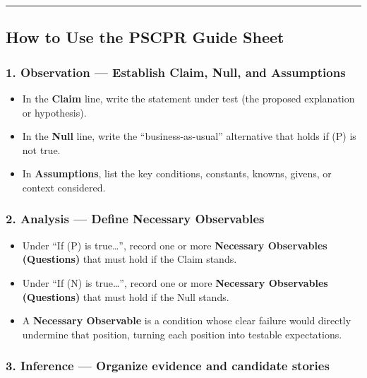 \documentclass[
  letterpaper,
  DIV=11,
  numbers=noendperiod]{scrartcl}
\providecommand{\tightlist}{%
  \setlength{\itemsep}{0pt}\setlength{\parskip}{0pt}}
\begin{document}
\begin{center}\rule{0.5\linewidth}{0.5pt}\end{center}

\subsection{How to Use the PSCPR Guide
Sheet}\label{how-to-use-the-pscpr-guide-sheet}

\subsubsection{1. Observation --- Establish Claim, Null, and
Assumptions}\label{observation-establish-claim-null-and-assumptions}

\begin{itemize}
\tightlist
\item
  In the \textbf{Claim} line, write the statement under test (the
  proposed explanation or hypothesis).
\item
  In the \textbf{Null} line, write the ``business-as-usual'' alternative
  that holds if (P) is not true.
\item
  In \textbf{Assumptions}, list the key conditions, constants, knowns,
  givens, or context considered.
\end{itemize}

\subsubsection{2. Analysis --- Define Necessary
Observables}\label{analysis-define-necessary-observables}

\begin{itemize}
\tightlist
\item
  Under ``If (P) is true\ldots{}'', record one or more \textbf{Necessary
  Observables (Questions)} that must hold if the Claim stands.
\item
  Under ``If (N) is true\ldots{}'', record one or more \textbf{Necessary
  Observables (Questions)} that must hold if the Null stands.
\item
  A \textbf{Necessary Observable} is a condition whose clear failure
  would directly undermine that position, turning each position into
  testable expectations.
\end{itemize}

\subsubsection{3. Inference --- Organize evidence and candidate
stories}\label{inference-organize-evidence-and-candidate-stories}
\end{document}
